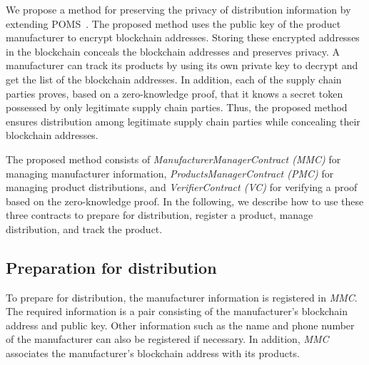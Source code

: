 \documentclass[conference]{IEEEtran}
\begin{document}
We propose a method for preserving the privacy of distribution information %
by extending POMS~\cite{Toyoda2017}.
The proposed method uses the public key of the product manufacturer to encrypt blockchain addresses.
Storing these encrypted addresses in the blockchain conceals the blockchain addresses and preserves privacy.
A manufacturer can track its products by using its own private key to decrypt and get the list of the blockchain addresses.
In addition, each of the %
supply chain parties proves, based on a zero-knowledge proof, that it knows a secret token possessed by only legitimate %
supply chain parties.
Thus, the proposed method ensures distribution among legitimate %
supply chain parties while concealing their blockchain addresses.

The proposed method consists of \textit{ManufacturerManagerContract (MMC)} for managing manufacturer information, \textit{ProductsManagerContract (PMC)} for managing product distributions, and \textit{VerifierContract (VC)} for verifying a proof based on the zero-knowledge proof.
In the following, we describe how to use these three contracts to prepare for distribution, register a product, manage distribution, and track the product.

\subsection{Preparation for distribution}
To prepare for distribution, the manufacturer information is registered in \textit{MMC}.
The required information is a pair consisting of the manufacturer's blockchain address and public key.
Other information such as the name and phone number of the manufacturer %
can also be registered if necessary.
In addition, \textit{MMC} associates the manufacturer's blockchain address with its products.
\end{document}
